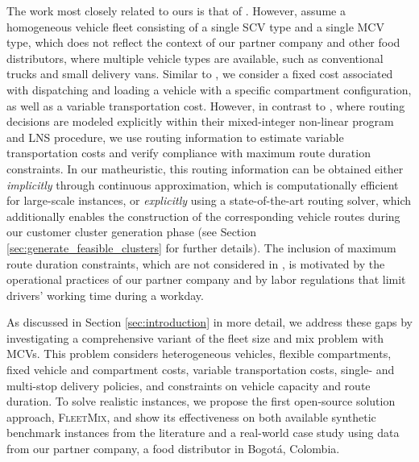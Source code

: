 \documentclass[11pt]{elsarticle}
\theoremstyle{plain}
\newcommand{\blue}[1]{#1}
\begin{document}
The work most closely related to ours is that of \cite{OstermeierHübner2018}. \blue{However, \cite{OstermeierHübner2018} assume a homogeneous vehicle fleet consisting of a single \ac{SCV} type and a single \ac{MCV} type, which does not reflect the context of our partner company and other food distributors, where multiple vehicle types are available, such as conventional trucks and small delivery vans. Similar to \cite{OstermeierHübner2018}, we consider a fixed cost associated with dispatching and loading a vehicle with a specific compartment configuration, as well as a variable transportation cost. 
However, in contrast to \cite{OstermeierHübner2018}, where routing decisions are modeled explicitly within their mixed-integer non-linear program and \ac{LNS} procedure, we use routing information to estimate variable transportation costs and verify compliance with maximum route duration constraints. In our matheuristic, this routing information can be obtained either \emph{implicitly} through continuous approximation, which is computationally efficient for large-scale instances, or \emph{explicitly} using a state-of-the-art routing solver, which additionally enables the construction of the corresponding vehicle routes during our customer cluster generation phase (see Section \ref{sec:generate_feasible_clusters} for further details).
The inclusion of maximum route duration constraints, which are not considered in \cite{OstermeierHübner2018}, is motivated by the operational practices of our partner company and by labor regulations that limit drivers' working time during a workday.}

\blue{As discussed in Section \ref{sec:introduction} in more detail, we address these gaps by investigating a comprehensive variant of the fleet size and mix problem with \acp{MCV}. This problem considers heterogeneous vehicles, flexible compartments, fixed vehicle and compartment costs, variable transportation costs, single- and multi-stop delivery policies, and constraints on vehicle capacity and route duration. To solve realistic instances, we propose the first open-source solution approach, \textsc{FleetMix}, and show its effectiveness on both available synthetic benchmark instances from the literature and a real-world case study using data from our partner company, a food distributor in Bogotá, Colombia.}

\end{document}
